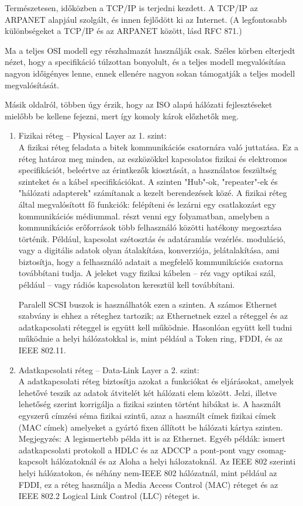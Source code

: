 \documentclass[12pt, a4paper]{article}
\begin{document}
Természetesen, időközben a TCP/IP is terjedni kezdett. A TCP/IP az ARPANET alapjául szolgált, és innen fejlődött ki az Internet. (A legfontosabb különbségeket a TCP/IP és az ARPANET között, lásd RFC 871.)

Ma a teljes OSI modell egy részhalmazát használják csak. Széles körben elterjedt nézet, hogy a specifikáció túlzottan bonyolult, és a teljes modell megvalósítása nagyon időigényes lenne, ennek ellenére nagyon sokan támogatják a teljes modell megvalósítását.

Másik oldalról, többen úgy érzik, hogy az ISO alapú hálózati fejlesztéseket mielőbb be kellene fejezni, mert így komoly károk előzhetők meg.
\begin{enumerate}
\item
Fizikai réteg – Physical Layer az 1. szint:\\
A fizikai réteg feladata a bitek kommunikációs csatornára való juttatása. Ez a réteg határoz meg minden, az eszközökkel kapcsolatos fizikai és elektromos specifikációt, beleértve az érintkezők kiosztását, a használatos feszültség szinteket és a kábel specifikációkat. A szinten "Hub"-ok, "repeater"-ek és "hálózati adapterek" számítanak a kezelt berendezések közé. A fizikai réteg által megvalósított fő funkciók:
felépíteni és lezárni egy csatlakozást egy kommunikációs médiummal.
részt venni egy folyamatban, amelyben a kommunikációs erőforrások több felhasználó közötti hatékony megosztása történik. Például, kapcsolat szétosztás és adatáramlás vezérlés.
moduláció, vagy a digitális adatok olyan átalakítása, konverziója, jelátalakítása, ami biztosítja, hogy a felhasználó adatait a megfelelő kommunikációs csatorna továbbítani tudja. A jeleket vagy fizikai kábelen – réz vagy optikai szál, például – vagy rádiós kapcsolaton keresztül kell továbbítani.

Paralell SCSI buszok is használhatók ezen a szinten. A számos Ethernet szabvány is ehhez a réteghez tartozik; az Ethernetnek ezzel a réteggel és az adatkapcsolati réteggel is együtt kell működnie. Hasonlóan együtt kell tudni működnie a helyi hálózatokkal is, mint például a Token ring, FDDI, és az IEEE 802.11.
\item
Adatkapcsolati réteg – Data-Link Layer a 2. szint:\\
A adatkapcsolati réteg biztosítja azokat a funkciókat és eljárásokat, amelyek lehetővé teszik az adatok átvitelét két hálózati elem között. Jelzi, illetve lehetőség szerint korrigálja a fizikai szinten történt hibákat is. A használt egyszerű címzési séma fizikai szintű, azaz a használt címek fizikai címek (MAC címek) amelyeket a gyártó fixen állított be hálózati kártya szinten. Megjegyzés: A legismertebb példa itt is az Ethernet. Egyéb példák: ismert adatkapcsolati protokoll a HDLC és az ADCCP a pont-pont vagy csomag-kapcsolt hálózatoknál és az Aloha a helyi hálozatoknál. Az IEEE 802 szerinti helyi hálózatokon, és néhány nem-IEEE 802 hálózatnál, mint például az FDDI, ez a réteg használja a Media Access Control (MAC) réteget és az IEEE 802.2 Logical Link Control (LLC) réteget is.


\end{enumerate}
\end{document}
